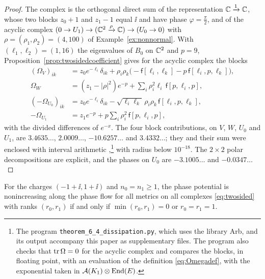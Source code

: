 \begin{proof}
The complex is the orthogonal direct sum of the representation
$\mathbb C\xrightarrow1\mathbb C$, whose two blocks $z_0+1$ and $z_1-1$ equal $\ii$ and
have phase $\varphi=\frac\pi2$, and of the acyclic complex
$(0\to U_1)\to(\mathbb C^2\xrightarrow{\rho}\mathbb C)\to(U_0\to0)$ with
$\rho=(\rho_1,\rho_2)=(4,100)$ of Example~\ref{ex:nonnormal}. With
$(\ell_1,\ell_2)=(1,16)$ the eigenvalues of $B_0$ on $\mathbb C^2$ and $p=9$,
Proposition~\ref{prop:twosidedcoefficient} gives for the acyclic complex the
blocks
\begin{align*}
 (\Omega_V)_{ik}&=z_0e^{-\ell_i}\delta_{ik}+\rho_i\rho_k\bigl(-\mathsf f[\ell_i,\ell_k]-p\,\mathsf f[\ell_i,p,\ell_k]\bigr),\\
 \Omega_W&=(z_1-|\rho|^2)e^{-p}+\sum_i\rho_i^2\ell_i\,\mathsf f[p,\ell_i,p],\\
 (-\Omega_{U_0})_{ik}&=z_0e^{-\ell_i}\delta_{ik}-\sqrt{\ell_i\ell_k}\,\rho_i\rho_k\,\mathsf f[\ell_i,p,\ell_k],\\
 -\Omega_{U_1}&=z_1e^{-p}+p\sum_i\rho_i^2\,\mathsf f[p,\ell_i,p],
\end{align*}
with the divided differences of $e^{-x}$. The four block contributions, on
$V$, $W$, $U_0$ and $U_1$, are $3.4635\ldots$, $2.0009\ldots$,
$-10.6257\ldots$ and $3.4332\ldots$; they and their sum were enclosed with
interval arithmetic \cite{joh17},\footnote{The program
\texttt{theorem\_6\_4\_dissipation.py}, which uses the library Arb, and its
output accompany this paper as supplementary files. The program also checks
that $\operatorname{tr}\Omega=0$ for the acyclic complex and compares the blocks, in
floating point, with an evaluation of the definition \eqref{eq:Omegadef},
with the exponential taken in $\mathcal A(K_1)\otimes\operatorname{End}(E)$.} with radius below
$10^{-18}$. The $2\times2$ polar decompositions are explicit, and the phases
on $U_0$ are $-3.1005\ldots$ and $-0.0347\ldots$
\end{proof}

\begin{corollary}\label{cor:classification}
For the charges $(-1+\ii,1+\ii)$ and $n_0=n_1\geq1$, the phase potential is
nonincreasing along the phase flow for all metrics on all complexes
\eqref{eq:twosided} with ranks $(r_0,r_1)$ if and only if $\min(r_0,r_1)=0$
or $r_0=r_1=1$.
\end{corollary}

